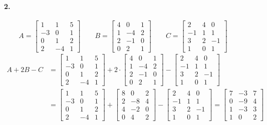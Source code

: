 \documentclass[12pt,a4paper,fleqn]{article}
\newcommand{\myparagraph}[1]{\paragraph{#1}\mbox{}}
\begin{document}
\myparagraph{2.}
\[
  A = \begin{bmatrix} 1 & 1 & 5 \\ -3 & 0 & 1 \\ 0 & 1 & 2 \\ 2 & -4 & 1
    \end{bmatrix} \qquad
  B = \begin{bmatrix} 4 & 0 & 1 \\ 1 & -4 & 2 \\ 2 & -1 & 0 \\ 0 & 2 & 1
    \end{bmatrix} \qquad
  C = \begin{bmatrix} 2 & 4 & 0 \\ -1 & 1 & 1 \\ 3 & 2 & -1 \\ 1 & 0 & 1
    \end{bmatrix} \qquad
\]
\begin{align*}
  A+2B-C &=
  \begin{bmatrix} 1 & 1 & 5 \\ -3 & 0 & 1 \\ 0 & 1 & 2 \\ 2 & -4 & 1 \end{bmatrix}
  + 2 \cdot
  \begin{bmatrix} 4 & 0 & 1 \\ 1 & -4 & 2 \\ 2 & -1 & 0 \\ 0 & 2 & 1 \end{bmatrix}
  -
  \begin{bmatrix} 2 & 4 & 0 \\ -1 & 1 & 1 \\ 3 & 2 & -1 \\ 1 & 0 & 1 \end{bmatrix} \\
  &=
  \begin{bmatrix} 1 & 1 & 5 \\ -3 & 0 & 1 \\ 0 & 1 & 2 \\ 2 & -4 & 1 \end{bmatrix}
  +
  \begin{bmatrix} 8 & 0 & 2 \\ 2 & -8 & 4 \\ 4 & -2 & 0 \\ 0 & 4 & 2 \end{bmatrix}
  -
  \begin{bmatrix} 2 & 4 & 0 \\ -1 & 1 & 1 \\ 3 & 2 & -1 \\ 1 & 0 & 1 \end{bmatrix}
  =
  \begin{bmatrix} 7 & -3 & 7 \\ 0 & -9 & 4 \\ 1 & -3 & 3 \\ 1 & 0 & 2 \end{bmatrix}
\end{align*}
\end{document}
